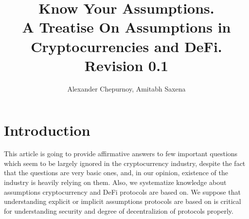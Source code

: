 \documentclass{article}   %
\begin{document}
\title{Know Your Assumptions. \\
\small A Treatise On Assumptions in Cryptocurrencies and DeFi. \\
\small Revision 0.1
}
\author{Alexander Chepurnoy, Amitabh Saxena}


\maketitle

\begin{abstract}
\end{abstract}

% 

\section{Introduction}

This article is going to provide affirmative answers to few important 
questions which seem to be largely ignored in the cryptocurrency industry, despite the fact 
that the questions are very basic ones, and, in our opinion, existence of the industry is heavily relying on them. 
Also, we systematize knowledge about assumptions cryptocurrency and DeFi protocols are based on. We suppose that understanding explicit or implicit assumptions
 protocols are based on is critical for understanding security and degree of decentralizion of protocols properly.
\end{document}

